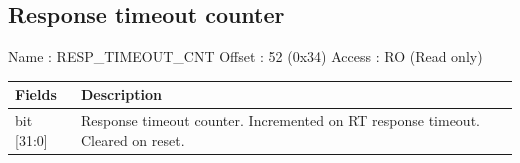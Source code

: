 \documentclass[11pt,a4paper]{article}
\begin{document}
\subsection{Response timeout counter}

Name   : RESP\_TIMEOUT\_CNT \newline
Offset : 52 (0x34) \newline
Access : RO (Read only) \newline

\begin{table}[h!]
  \begin{tabularx}{\textwidth}{ l X }
    \hline
    \textbf{Fields} & \textbf{Description}\\
    \hline
    bit [31:0]  & Response timeout counter. Incremented on RT response timeout. Cleared on reset. \\
    \hline
  \end{tabularx}
\end{table}
\end{document}
